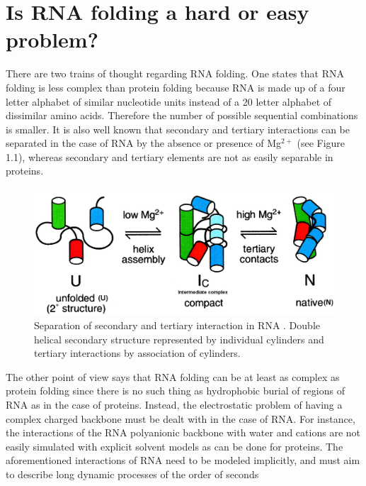 \section{Is RNA folding a hard or easy problem?}
There are two trains of thought regarding RNA folding. One states
that RNA folding is less complex than protein folding
\cite{tinoco1999} because RNA is made up of a four letter alphabet
of similar nucleotide units instead of a 20 letter alphabet of
dissimilar amino acids. Therefore the number of possible sequential
combinations is smaller. It is also well known that secondary and
tertiary interactions can be separated in the case of RNA by the
absence or presence of Mg$^{2+}$ \cite{rangan2003} (see Figure 1.1),
whereas secondary and tertiary elements are not as easily separable in proteins.
\begin{figure}[ht]
\centering
\includegraphics[scale=0.3]{Chapter1/rangan2003pnas.png}
\caption{Separation of secondary and tertiary interaction in
RNA \cite{rangan2003}. Double helical secondary structure
represented  by individual cylinders and tertiary interactions by
association of cylinders.}
\end{figure}
The other point of view says that RNA folding can be at least as
complex as protein folding \cite{moore1999a, sorin2004} since there
is no such thing as hydrophobic burial of regions of RNA as in the
case of proteins. Instead, the electrostatic problem of having a
complex charged backbone must be dealt with in the case of RNA.
For instance, the interactions of the RNA polyanionic backbone with
water and cations \cite{klein2004a} are not easily simulated with
explicit solvent models as can be done for proteins. The
aforementioned interactions of RNA need to be modeled implicitly, and
must aim to describe long dynamic processes of the order of seconds
